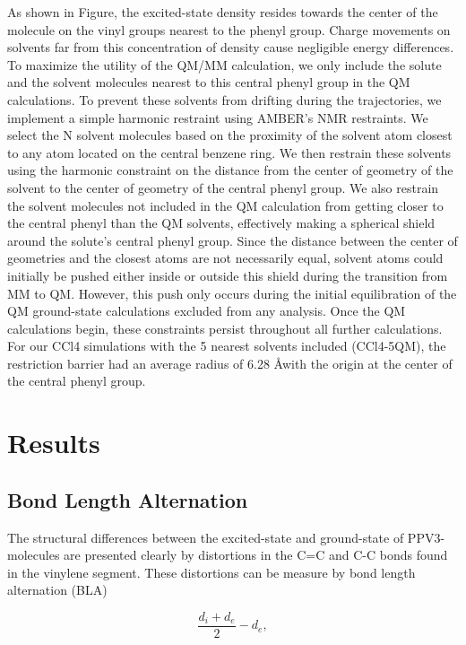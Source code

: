 As shown in Figure, the excited-state density resides towards the center of the molecule on the vinyl groups nearest to the phenyl group.
Charge movements on solvents far from this concentration of density cause negligible energy differences.
To maximize the utility of the QM/MM calculation, we only include the solute and the solvent molecules nearest to this central phenyl group in the QM calculations.
To prevent these solvents from drifting during the trajectories, we implement a simple harmonic restraint using AMBER's NMR restraints.
We select the N solvent molecules based on the proximity of the solvent atom closest to any atom located on the central benzene ring.
We then restrain these solvents using the harmonic constraint on the distance from the center of geometry of the solvent to the center of geometry of the central phenyl group.
We also restrain the solvent molecules not included in the QM calculation from getting closer to the central phenyl than the QM solvents, effectively making a spherical shield around the solute's central phenyl group.
Since the distance between the center of geometries and the closest atoms are not necessarily equal, solvent atoms could initially be pushed either inside or outside this shield during the transition from MM to QM.
However, this push only occurs during the initial equilibration of the QM ground-state calculations excluded from any analysis.
Once the QM calculations begin, these constraints persist throughout all further calculations.
For our CCl4 simulations with the 5 nearest solvents included (CCl4-5QM), the restriction barrier had an average radius of 6.28 \AA with the origin at the center of the central phenyl group.

\section{Results}

\subsection{Bond Length Alternation}
	The structural differences between the excited-state and ground-state of PPV3-molecules are presented clearly by distortions in the C=C and C-C bonds found in the vinylene segment.\cite{tretiak02_densit_matrix_analy_simul_elect, karabunarliev2000rigorous, karabunarliev2000adiabatic, nelson2014nonadiabatic}
	These distortions can be measure by bond length alternation (BLA)

	\begin{equation}
	\frac{d_i + d_e}{2} - d_e,
	\end{equation}

